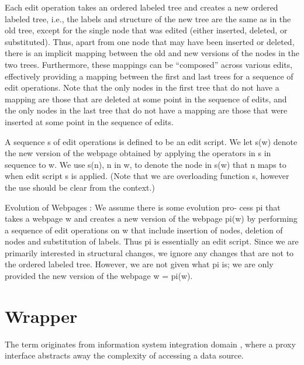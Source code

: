Each edit operation takes an ordered labeled tree and creates a
new ordered labeled tree, i.e., the labels and structure of the new
tree are the same as in the old tree, except for the single node that
was edited (either inserted, deleted, or substituted). Thus, apart
from one node that may have been inserted or deleted, there is an
implicit mapping between the old and new versions of the nodes
in the two trees. Furthermore, these mappings can be “composed”
across various edits, effectively providing a mapping between the
first and last trees for a sequence of edit operations. Note that the
only nodes in the first tree that do not have a mapping are those
that are deleted at some point in the sequence of edits, and the only
nodes in the last tree that do not have a mapping are those that were
inserted at some point in the sequence of edits.

A sequence s of edit operations is defined to be an edit script.
We let s(w) denote the new version of the webpage obtained by
applying the operators in s in sequence to w. We use s(n), n in w,
to denote the node in s(w) that n maps to when edit script s is
applied. (Note that we are overloading function s, however the use
should be clear from the context.)

Evolution of Webpages : We assume there is some evolution pro-
cess pi that takes a webpage w and creates a new version of the
webpage pi(w) by performing a sequence of edit operations on w
that include insertion of nodes, deletion of nodes and substitution of
labels. Thus pi is essentially an edit script. Since we are primarily
interested in structural changes, we ignore any changes that are not
to the ordered labeled tree. However, we are not given what pi is;
we are only provided the new version of the webpage w = pi(w).


\cite{de2004a}

\section{Wrapper}

The term originates from information system integration domain \cite{Chang:2006:SWI:1159162.1159300}, where a proxy interface abstracts away the complexity of accessing a data source. 


